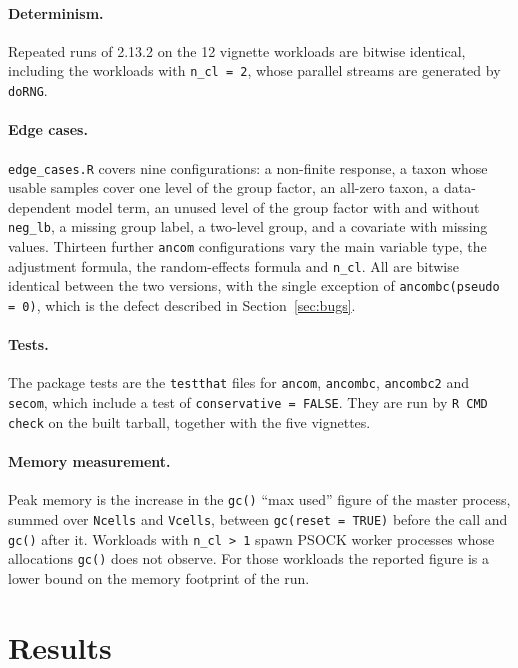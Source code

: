 \documentclass[11pt]{article}
\newcommand{\code}[1]{\texttt{#1}}
\begin{document}
\paragraph{Determinism.} Repeated runs of 2.13.2 on the 12 vignette workloads
are bitwise identical, including the workloads with \code{n\_cl = 2}, whose
parallel streams are generated by \code{doRNG}.

\paragraph{Edge cases.} \code{edge\_cases.R} covers nine configurations: a
non-finite response, a taxon whose usable samples cover one level of the group
factor, an all-zero taxon, a data-dependent model term, an unused level of the
group factor with and without \code{neg\_lb}, a missing group label, a
two-level group, and a covariate with missing values. Thirteen further
\code{ancom} configurations vary the main variable type, the adjustment
formula, the random-effects formula and \code{n\_cl}. All are bitwise identical
between the two versions, with the single exception of
\code{ancombc(pseudo = 0)}, which is the defect described in
Section~\ref{sec:bugs}.

\paragraph{Tests.} The package tests are the \code{testthat} files for
\code{ancom}, \code{ancombc}, \code{ancombc2} and \code{secom}, which include a
test of \code{conservative = FALSE}. They are run by \code{R CMD check} on the
built tarball, together with the five vignettes.

\paragraph{Memory measurement.} Peak memory is the increase in the \code{gc()}
``max used'' figure of the master process, summed over \code{Ncells} and
\code{Vcells}, between \code{gc(reset = TRUE)} before the call and \code{gc()}
after it. Workloads with \code{n\_cl > 1} spawn PSOCK worker processes whose
allocations \code{gc()} does not observe. For those workloads the reported
figure is a lower bound on the memory footprint of the run.

\section{Results}
\end{document}
